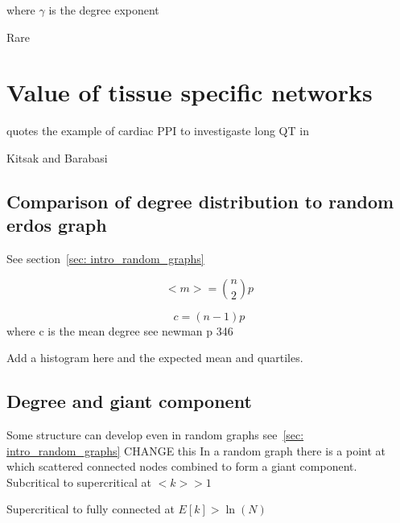 where $\gamma$ is the degree exponent \cite{barabasi2016network}

Rare \cite{broido2019scale}






\section{Value of tissue specific networks}
\cite{parikshak2015systems} quotes the example of cardiac PPI to investigaste long QT in \cite{lundby2014annotation}

Kitsak and Barabasi \cite{kitsak2016tissue}

\subsection{Comparison of degree distribution to random erdos graph}
See section~\ref{sec: intro_random_graphs}

\begin{equation}
    <m> = \binom{n}{2}p
\end{equation}


\begin{equation}
    c = (n-1)p
\end{equation}
where c is the mean degree see newman p 346

Add a histogram here and the expected mean and quartiles.


\subsection{Degree and giant component}
\label{sec:connected component and degree}
Some structure can develop even in random graphs see~\ref{sec: intro_random_graphs}
 CHANGE this
In a random graph there is a point at which scattered connected nodes combined to form a giant component. Subcritical to supercritical at $<k> >1$


Supercritical to fully connected at $E[k] > \ln(N)$


